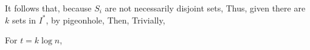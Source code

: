 It follows that, because $S_i$ are not necessarily disjoint sets,
Thus, given there are $k$ sets in $I^*$, by pigeonhole,
Then,
Trivially,
\begin{proposition}
    For $t = k \log n$,
\end{proposition}
